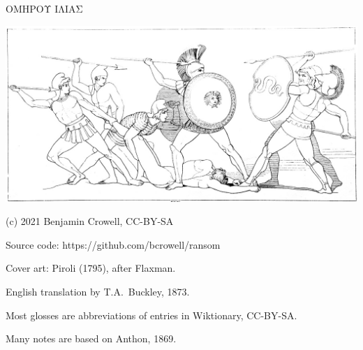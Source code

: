 \pagestyle{empty}

\vspace{25mm} %

\begin{center}

{\huge ΟΜΗΡΟΥ ΙΛΙΑΣ }

\vspace{10mm}

\includegraphics{iliad/figs/ajax-and-patroclus-body}

\vfill

\end{center}

\pagebreak

(c) 2021 Benjamin Crowell, CC-BY-SA

Source code: https://github.com/bcrowell/ransom

Cover art: Piroli (1795), after Flaxman.


English translation by T.A.~Buckley, 1873.

Most glosses are abbreviations of entries in Wiktionary, CC-BY-SA.

Many notes are based on Anthon, 1869.

\vfill
